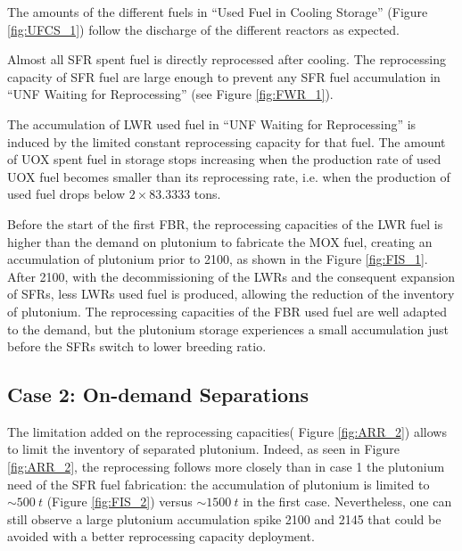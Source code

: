 \documentclass[12pt]{article}
\begin{document}
The amounts of the different fuels in ``Used Fuel in Cooling Storage'' (Figure
\ref{fig:UFCS_1}) follow the discharge of the different reactors as expected.


Almost all SFR spent fuel is directly reprocessed after cooling. The
reprocessing capacity of SFR fuel are large enough to prevent any SFR fuel
accumulation in ``UNF Waiting for Reprocessing'' (see Figure \ref{fig:FWR_1}).

The accumulation of LWR used fuel in ``UNF Waiting for Reprocessing'' is induced
by the limited constant reprocessing capacity for that fuel. The amount of UOX
spent fuel in storage stops increasing when the production rate of used UOX fuel
becomes smaller than its reprocessing rate, i.e. when the production of used
fuel drops below $2\times83.3333$ tons.
 


Before the start of the first FBR, the reprocessing capacities of the LWR fuel
is higher than the demand on plutonium to fabricate the MOX fuel, creating an
accumulation of plutonium prior to 2100, as shown in the Figure
\ref{fig:FIS_1}. After 2100, with the decommissioning of the LWRs and the
consequent expansion of SFRs, less LWRs used fuel is produced, allowing the
reduction of the inventory of plutonium. The reprocessing capacities of the FBR
used fuel are well adapted to the demand, but the plutonium storage experiences
a small accumulation just before the SFRs switch to lower breeding ratio.
 

\subsection{Case 2: On-demand Separations}

The limitation added on the reprocessing capacities( Figure \ref{fig:ARR_2}) allows to limit the
inventory of separated plutonium. Indeed, as seen in Figure \ref{fig:ARR_2}, the
reprocessing follows more closely than in case 1 the plutonium need of the SFR
fuel fabrication: the accumulation of plutonium is limited to $\sim500~t$
(Figure \ref{fig:FIS_2}) versus $\sim1500~t$ in the first case. Nevertheless,
one can still observe a large plutonium accumulation spike 2100 and 2145 that
could be avoided with a better reprocessing capacity deployment.
\end{document}
